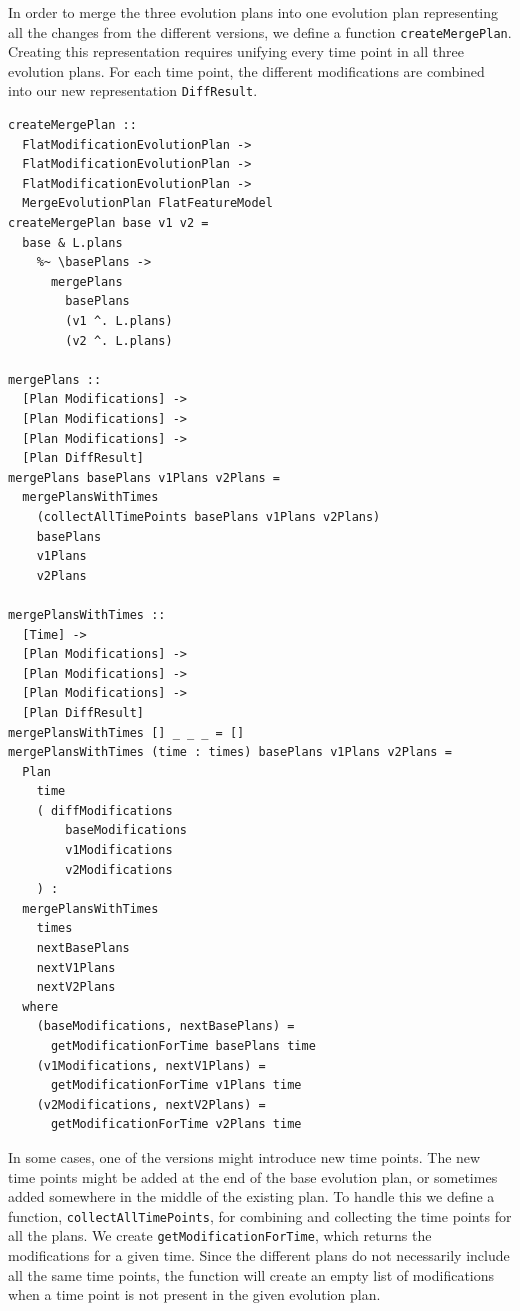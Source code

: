 \documentclass[a4paper,english]{ifimaster}
\begin{document}
In order to merge the three evolution plans into one evolution plan representing all the changes from the different versions, we define a function \texttt{create\-Merge\-Plan}. Creating this representation requires unifying every time point in all three evolution plans. For each time point, the different modifications are combined into our new representation \texttt{DiffResult}.

\begin{verbatim}
createMergePlan ::
  FlatModificationEvolutionPlan ->
  FlatModificationEvolutionPlan ->
  FlatModificationEvolutionPlan ->
  MergeEvolutionPlan FlatFeatureModel
createMergePlan base v1 v2 =
  base & L.plans
    %~ \basePlans ->
      mergePlans
        basePlans
        (v1 ^. L.plans)
        (v2 ^. L.plans)

mergePlans ::
  [Plan Modifications] ->
  [Plan Modifications] ->
  [Plan Modifications] ->
  [Plan DiffResult]
mergePlans basePlans v1Plans v2Plans =
  mergePlansWithTimes
    (collectAllTimePoints basePlans v1Plans v2Plans)
    basePlans
    v1Plans
    v2Plans

mergePlansWithTimes ::
  [Time] ->
  [Plan Modifications] ->
  [Plan Modifications] ->
  [Plan Modifications] ->
  [Plan DiffResult]
mergePlansWithTimes [] _ _ _ = []
mergePlansWithTimes (time : times) basePlans v1Plans v2Plans =
  Plan
    time
    ( diffModifications
        baseModifications
        v1Modifications
        v2Modifications
    ) :
  mergePlansWithTimes
    times
    nextBasePlans
    nextV1Plans
    nextV2Plans
  where
    (baseModifications, nextBasePlans) =
      getModificationForTime basePlans time
    (v1Modifications, nextV1Plans) =
      getModificationForTime v1Plans time
    (v2Modifications, nextV2Plans) =
      getModificationForTime v2Plans time
\end{verbatim}

In some cases, one of the versions might introduce new time points. The new time points might be added at the end of the base evolution plan, or sometimes added somewhere in the middle of the existing plan. To handle this we define a function, \texttt{collectAll\-TimePoints}, for combining and collecting the time points for all the plans. We create \texttt{getModification\-ForTime}, which returns the modifications for a given time. Since the different plans do not necessarily include all the same time points, the function will create an empty list of modifications when a time point is not present in the given evolution plan.
\end{document}
